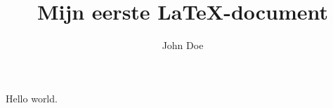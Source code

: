 \documentclass[a4paper,11pt]{article}
\author{John Doe}
\title{Mijn eerste \LaTeX-document}
\begin{document}
  \maketitle
  Hello world.
\end{document}

